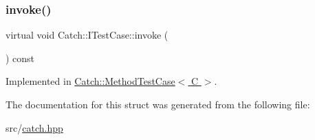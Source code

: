 \subsubsection{\texorpdfstring{invoke()}{invoke()}}
{\footnotesize\ttfamily virtual void Catch\+::\+I\+Test\+Case\+::invoke (\begin{DoxyParamCaption}{ }\end{DoxyParamCaption}) const\hspace{0.3cm}{\ttfamily [pure virtual]}}



Implemented in \hyperlink{class_catch_1_1_method_test_case_a4e2263cfa0646f2980768328cb372793}{Catch\+::\+Method\+Test\+Case$<$ C $>$}.



The documentation for this struct was generated from the following file\+:\begin{DoxyCompactItemize}
\item 
src/\hyperlink{catch_8hpp}{catch.\+hpp}\end{DoxyCompactItemize}
